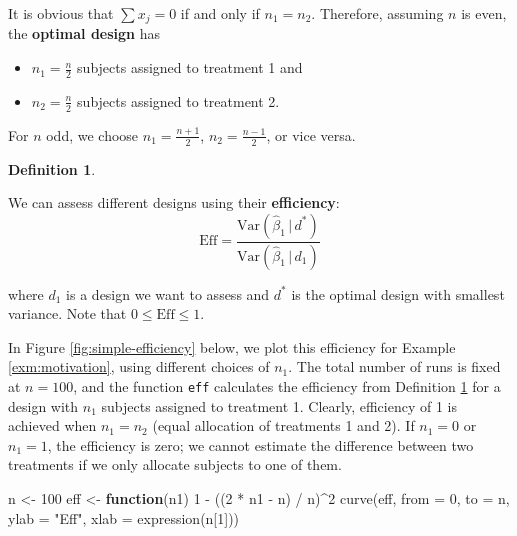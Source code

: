 \documentclass[
]{book}
\newenvironment{Shaded}{\begin{snugshade}}{\end{snugshade}}
\newcommand{\AttributeTok}[1]{\textcolor[rgb]{0.77,0.63,0.00}{#1}}
\newcommand{\ControlFlowTok}[1]{\textcolor[rgb]{0.13,0.29,0.53}{\textbf{#1}}}
\newcommand{\DecValTok}[1]{\textcolor[rgb]{0.00,0.00,0.81}{#1}}
\newcommand{\FunctionTok}[1]{\textcolor[rgb]{0.00,0.00,0.00}{#1}}
\newcommand{\NormalTok}[1]{#1}
\newcommand{\OtherTok}[1]{\textcolor[rgb]{0.56,0.35,0.01}{#1}}
\newcommand{\SpecialCharTok}[1]{\textcolor[rgb]{0.00,0.00,0.00}{#1}}
\newcommand{\StringTok}[1]{\textcolor[rgb]{0.31,0.60,0.02}{#1}}
\providecommand{\tightlist}{%
  \setlength{\itemsep}{0pt}\setlength{\parskip}{0pt}}
\theoremstyle{definition}
\newtheorem{definition}{Definition}[chapter]
\theoremstyle{definition}
\theoremstyle{definition}
\theoremstyle{definition}
\theoremstyle{remark}
\begin{document}
It is obvious that \(\sum x_j = 0\) if and only if \(n_1=n_2\). Therefore, assuming \(n\) is even, the \textbf{optimal design} has

\begin{itemize}
\tightlist
\item
  \(n_{1}=\frac{n}{2}\) subjects assigned to treatment 1 and
\item
  \(n_{2}=\frac{n}{2}\) subjects assigned to treatment 2.
\end{itemize}

For \(n\) odd, we choose \(n_{1}=\frac{n+1}{2}\), \(n_{2}=\frac{n-1}{2}\), or vice versa.

\begin{definition}
\protect\hypertarget{def:simple-efficiency}{}\label{def:simple-efficiency}

We can assess different designs using their \textbf{efficiency}:
\begin{equation}
\textrm{Eff}=\frac{\textrm{Var}(\hat{\beta}_{1}\, |\, d^{*})}{\textrm{Var}(\hat{\beta}_{1}\, |\, d_{1})}
\label{eq:simple-efficiency}
\end{equation}

where \(d_{1}\) is a design we want to assess and \(d^{*}\) is the optimal design with smallest variance. Note that \(0\leq\textrm{Eff}\leq 1\).

\end{definition}

In Figure \ref{fig:simple-efficiency} below, we plot this efficiency for Example \ref{exm:motivation}, using different choices of \(n_1\). The total number of runs is fixed at \(n = 100\), and the function \texttt{eff} calculates the efficiency from Definition \ref{def:simple-efficiency} for a design with \(n_1\) subjects assigned to treatment 1. Clearly, efficiency of 1 is achieved when \(n_1 = n_2\) (equal allocation of treatments 1 and 2). If \(n_1=0\) or \(n_1 = 1\), the efficiency is zero; we cannot estimate the difference between two treatments if we only allocate subjects to one of them.



\begin{Shaded}
\begin{Highlighting}[]
\NormalTok{n }\OtherTok{\textless{}{-}} \DecValTok{100} 
\NormalTok{eff }\OtherTok{\textless{}{-}} \ControlFlowTok{function}\NormalTok{(n1) }\DecValTok{1} \SpecialCharTok{{-}}\NormalTok{ ((}\DecValTok{2} \SpecialCharTok{*}\NormalTok{ n1 }\SpecialCharTok{{-}}\NormalTok{ n) }\SpecialCharTok{/}\NormalTok{ n)}\SpecialCharTok{\^{}}\DecValTok{2} 
\FunctionTok{curve}\NormalTok{(eff, }\AttributeTok{from =} \DecValTok{0}\NormalTok{, }\AttributeTok{to =}\NormalTok{ n, }\AttributeTok{ylab =} \StringTok{"Eff"}\NormalTok{, }\AttributeTok{xlab =} \FunctionTok{expression}\NormalTok{(n[}\DecValTok{1}\NormalTok{]))}
\end{Highlighting}
\end{Shaded}
\end{document}
